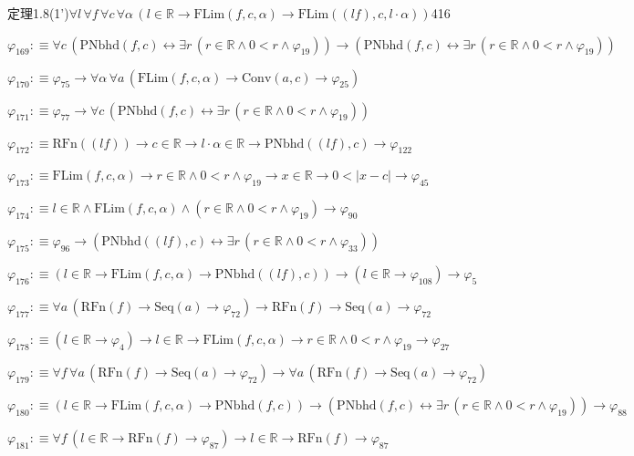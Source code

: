 \begin{fullproof}{定理1.8(1')}{$\forall l\,\forall f\,\forall c\,\forall \alpha\,(l \in \mathbb{R} \to \mathrm{FLim}(f,c,\alpha) \to \mathrm{FLim}((l f),c,l \cdot \alpha))$}{416}
\begin{abbrevlist}
\item $\varphi_{169} :\equiv \forall c\,(\mathrm{PNbhd}(f,c) \leftrightarrow \exists r\,(r \in \mathbb{R} \land 0 < r \land \varphi_{19})) \to (\mathrm{PNbhd}(f,c) \leftrightarrow \exists r\,(r \in \mathbb{R} \land 0 < r \land \varphi_{19}))$
\item $\varphi_{170} :\equiv \varphi_{75} \to \forall \alpha\,\forall a\,(\mathrm{FLim}(f,c,\alpha) \to \mathrm{Conv}(a,c) \to \varphi_{25})$
\item $\varphi_{171} :\equiv \varphi_{77} \to \forall c\,(\mathrm{PNbhd}(f,c) \leftrightarrow \exists r\,(r \in \mathbb{R} \land 0 < r \land \varphi_{19}))$
\item $\varphi_{172} :\equiv \mathrm{RFn}((l f)) \to c \in \mathbb{R} \to l \cdot \alpha \in \mathbb{R} \to \mathrm{PNbhd}((l f),c) \to \varphi_{122}$
\item $\varphi_{173} :\equiv \mathrm{FLim}(f,c,\alpha) \to r \in \mathbb{R} \land 0 < r \land \varphi_{19} \to x \in \mathbb{R} \to 0 < \lvert x - c \rvert \to \varphi_{45}$
\item $\varphi_{174} :\equiv l \in \mathbb{R} \land \mathrm{FLim}(f,c,\alpha) \land (r \in \mathbb{R} \land 0 < r \land \varphi_{19}) \to \varphi_{90}$
\item $\varphi_{175} :\equiv \varphi_{96} \to (\mathrm{PNbhd}((l f),c) \leftrightarrow \exists r\,(r \in \mathbb{R} \land 0 < r \land \varphi_{33}))$
\item $\varphi_{176} :\equiv (l \in \mathbb{R} \to \mathrm{FLim}(f,c,\alpha) \to \mathrm{PNbhd}((l f),c)) \to (l \in \mathbb{R} \to \varphi_{108}) \to \varphi_{5}$
\item $\varphi_{177} :\equiv \forall a\,(\mathrm{RFn}(f) \to \mathrm{Seq}(a) \to \varphi_{72}) \to \mathrm{RFn}(f) \to \mathrm{Seq}(a) \to \varphi_{72}$
\item $\varphi_{178} :\equiv (l \in \mathbb{R} \to \varphi_{4}) \to l \in \mathbb{R} \to \mathrm{FLim}(f,c,\alpha) \to r \in \mathbb{R} \land 0 < r \land \varphi_{19} \to \varphi_{27}$
\item $\varphi_{179} :\equiv \forall f\,\forall a\,(\mathrm{RFn}(f) \to \mathrm{Seq}(a) \to \varphi_{72}) \to \forall a\,(\mathrm{RFn}(f) \to \mathrm{Seq}(a) \to \varphi_{72})$
\item $\varphi_{180} :\equiv (l \in \mathbb{R} \to \mathrm{FLim}(f,c,\alpha) \to \mathrm{PNbhd}(f,c)) \to (\mathrm{PNbhd}(f,c) \leftrightarrow \exists r\,(r \in \mathbb{R} \land 0 < r \land \varphi_{19})) \to \varphi_{88}$
\item $\varphi_{181} :\equiv \forall f\,(l \in \mathbb{R} \to \mathrm{RFn}(f) \to \varphi_{87}) \to l \in \mathbb{R} \to \mathrm{RFn}(f) \to \varphi_{87}$

\end{abbrevlist}
\end{fullproof}
